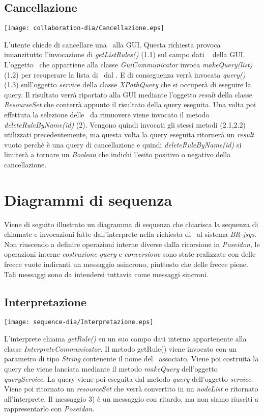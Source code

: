 \subsection{Cancellazione \br}
\begin{center}
 \texttt{[image: collaboration-dia/Cancellazione.eps]}
\end{center}
L'utente chiede di cancellare una \br\ alla GUI. Questa richiesta provoca innanzitutto l'invocazione di \textit{getListRules()} (1.1) sul campo dati \textit{\rp\ } della GUI. L'oggetto \rp\ che appartiene alla classe \textit{GuiCommunicator} invoca \textit{makeQuery(list)} (1.2) per recuperare la lista di \brs\ dal \rp. E di conseguenza verr\`a invocata \textit{query()} (1.3) sull'oggetto \textit{servic}e della classe \textit{XPathQuery} che si occuper\`a di eseguire la query. Il risultato verr\`a riportato alla GUI mediante l'oggetto \textit{result} della classe \textit{ResourseSet} che conterr\`a appunto il risultato della query eseguita. Una volta poi effettuta la selezione delle \brs\ da rimuovere viene invocato il metodo \textit{deleteRuleByName(id)} (2). Vengono quindi invocati gli stessi metodi (2.1,2.2) utilizzati precedentemente, ma questa volta la query eseguita ritorner\`a un \textit{result} vuoto perch\`e \`e una query di cancellazione e quindi \textit{deleteRuleByName(id)} si limiter\`a a tornare un \textit{Boolean} che indichi l'esito positivo o negativo della cancellazione.

\section{Diagrammi di sequenza}
Viene di seguito illustrato un diagramma di sequenza che chiarisca la sequenza di chiamate e invocazioni fatte dall'interprete nella richiesta di \brs\ al sistema \textit{BR-jsys}. Non riuscendo a definire operazioni interne diverse dalla ricorsione in \textit{Poseidon}, le operazioni interne \textit{costruzione query} e \textit{conversione} sono state realizzate con delle frecce vuote indicanti un messaggio asincrono, piuttosto che delle frecce piene. Tali messaggi sono da intendersi tuttavia come messaggi sincroni.
\subsection{Interpretazione}
\begin{center}
 \texttt{[image: sequence-dia/Interpretazione.eps]}
\end{center}
L'interprete chiama \textit{getRule()} su un suo campo dati interno appartenente alla classe \textit{InterpreteCommunicator}. Il metodo getRule() viene invocato con un parametro di tipo \textit{String} contenente il nome del \bo\ associato. Viene poi costruita la query che viene lanciata mediante il metodo \textit{makeQuery} dell'oggetto \textit{queryService}. La query viene poi eseguita dal metodo \textit{query} dell'oggetto \textit{service}. Viene poi ritornato un \textit{resourceSet} che verr\`a convertito in un \textit{nodeList} e ritornato all'interprete. Il messaggio 3) \`e un messaggio con ritardo, ma non siamo riusciti a rappresentarlo con \textit{Poseidon}.

